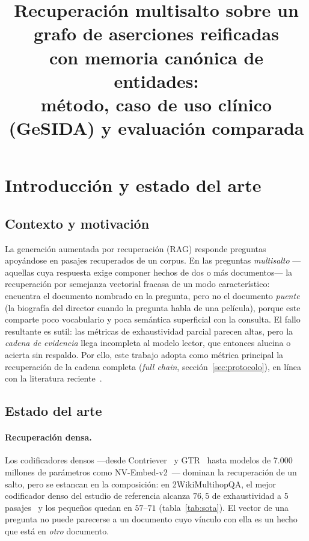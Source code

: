 \documentclass[11pt,a4paper]{article}
\title{Recuperación multisalto sobre un grafo de aserciones reificadas\\
con memoria canónica de entidades:\\
método, caso de uso clínico (GeSIDA) y evaluación comparada}
\author{}
\date{}
\begin{document}
\maketitle
\vspace{-3em}

\section{Introducción y estado del arte}
\label{sec:intro}

\subsection{Contexto y motivación}

La generación aumentada por recuperación (RAG) responde preguntas
apoyándose en pasajes recuperados de un corpus. En las preguntas
\emph{multisalto} ---aquellas cuya respuesta exige componer hechos de dos o
más documentos--- la recuperación por semejanza vectorial fracasa de un modo
característico: encuentra el documento nombrado en la pregunta, pero no el
documento \emph{puente} (la biografía del director cuando la pregunta habla
de una película), porque este comparte poco vocabulario y poca semántica
superficial con la consulta. El fallo resultante es sutil: las métricas de
exhaustividad parcial parecen altas, pero la \emph{cadena de evidencia}
llega incompleta al modelo lector, que entonces alucina o acierta sin
respaldo. Por ello, este trabajo adopta como métrica principal la
recuperación de la cadena completa
(\emph{full chain}, sección~\ref{sec:protocolo}), en línea con la
literatura reciente~\cite{catrag}.

\subsection{Estado del arte}

\paragraph{Recuperación densa.}
Los codificadores densos ---desde Contriever~\cite{contriever} y
GTR~\cite{gtr} hasta modelos de 7.000 millones de parámetros como
NV-Embed-v2~\cite{nvembed}--- dominan la recuperación de un salto, pero se
estancan en la composición: en 2WikiMultihopQA, el mejor codificador denso
del estudio de referencia alcanza $76{,}5$ de exhaustividad a 5
pasajes~\cite{hipporag2} y los pequeños quedan en $57$--$71$
(tabla~\ref{tab:sota}). El vector de una pregunta no puede parecerse a un
documento cuyo vínculo con ella es un hecho que está en \emph{otro}
documento.
\end{document}
